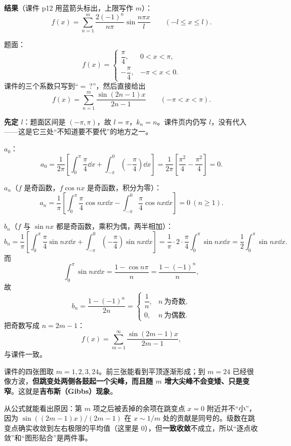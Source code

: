 \documentclass[11pt]{ctexart}
\begin{document}
\textbf{结果}（课件 p12 用蓝箭头标出，上限写作 $m$）：
\[ f(x)=\sum_{n=1}^{m}\frac{2(-1)^n}{n\pi}\sin\frac{n\pi x}{l}\qquad(-l\le x\le l) .\]



题面：
\[
f(x)=\begin{cases}\dfrac{\pi}{4}, & 0<x<\pi,\\[4pt] -\dfrac{\pi}{4}, & -\pi<x<0 .\end{cases}
\]
课件的三个系数只写到“$=\ ?$”，然后直接给出
\[ f(x)=\sum_{n=1}^{m}\frac{\sin(2n-1)x}{2n-1}\qquad(-\pi<x<\pi) .\]

\textbf{先定 $l$}：题面区间是 $(-\pi,\pi)$，故 $l=\pi$，$k_n=n$。课件页内仍写 $l$，没有代入——这是它三处“不知道要不要代”的地方之一。

\textbf{$a_0$}：
\[ a_0=\frac{1}{2\pi}\left[\int_0^{\pi}\frac{\pi}{4}\dd x+\int_{-\pi}^{0}\left(-\frac{\pi}{4}\right)\dd x\right]=\frac{1}{2\pi}\left[\frac{\pi^{2}}{4}-\frac{\pi^{2}}{4}\right]=0 .\]

\textbf{$a_n$}（$f$ 是奇函数，$f\cos nx$ 是奇函数，积分为零）：
\[ a_n=\frac{1}{\pi}\left[\int_0^{\pi}\frac{\pi}{4}\cos nx\dd x-\int_{-\pi}^{0}\frac{\pi}{4}\cos nx\dd x\right]=0\ (n\ge1) .\]

\textbf{$b_n$}（$f$ 与 $\sin nx$ 都是奇函数，乘积为偶，两半相加）：
\[
b_n=\frac{1}{\pi}\left[\int_0^{\pi}\frac{\pi}{4}\sin nx\dd x+\int_{-\pi}^{0}\left(-\frac{\pi}{4}\right)\sin nx\dd x\right]
=\frac{1}{\pi}\cdot 2\cdot\frac{\pi}{4}\int_0^{\pi}\sin nx\dd x
=\frac{1}{2}\int_0^{\pi}\sin nx\dd x .
\]
而
\[ \int_0^{\pi}\sin nx\dd x=\frac{1-\cos n\pi}{n}=\frac{1-(-1)^n}{n} ,\]
故
\[
b_n=\frac{1-(-1)^n}{2n}=
\begin{cases}\dfrac{1}{n}, & n\ \text{为奇数},\\[6pt] 0, & n\ \text{为偶数}.\end{cases}
\]
把奇数写成 $n=2m-1$：
\[ f(x)=\sum_{m=1}^{\infty}\frac{\sin(2m-1)x}{2m-1} ,\]
与课件一致。


课件的四张图取 $m=1,2,3,24$。前三张能看到平顶逐渐形成；到 $m=24$ 已经很像方波，\textbf{但跳变处两侧各鼓起一个尖峰，而且随 $m$ 增大尖峰不会变矮、只是变窄}。这就是\textbf{吉布斯（Gibbs）现象}。

从公式就能看出原因：第 $m$ 项之后被丢掉的余项在跳变点 $x=0$ 附近并不“小”，因为 $\sin((2m-1)x)/(2m-1)$ 在 $x\sim1/m$ 处的贡献是同号的。级数在跳变点确实收敛到左右极限的平均值（这里是 $0$），但\textbf{一致收敛}不成立，所以“逐点收敛”和“图形贴合”是两件事。
\end{document}
